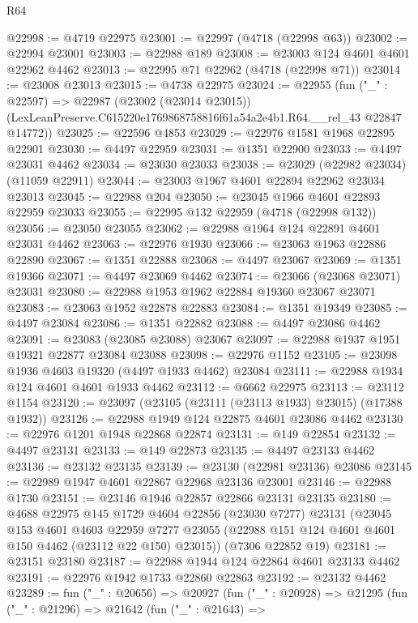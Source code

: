 \begin{lexlean}{R64}
\begin{coremodule}
@22998 := @4719 @22975
@23001 := @22997 (@4718 (@22998 @63))
@23002 := @22994 @23001
@23003 := @22988 @189
@23008 := @23003 @124 @4601 @4601 @22962 @4462
@23013 := @22995 @71 @22962 (@4718 (@22998 @71))
@23014 := @23008 @23013
@23015 := @4738 @22975
@23024 := @22955
    (fun ("_" : @22597) =>
    @22987
      (@23002 (@23014 @23015))
      (LexLeanPreserve.C615220e1769868758816f61a54a2e4b1.R64.__rel_43 @22847 @14772))
@23025 := @22596 @4853
@23029 := @22976 @1581 @1968 @22895 @22901
@23030 := @4497 @22959
@23031 := @1351 @22900
@23033 := @4497 @23031 @4462
@23034 := @23030 @23033
@23038 := @23029 (@22982 @23034) (@11059 @22911)
@23044 := @23003 @1967 @4601 @22894 @22962 @23034 @23013
@23045 := @22988 @204
@23050 := @23045 @1966 @4601 @22893 @22959 @23033
@23055 := @22995 @132 @22959 (@4718 (@22998 @132))
@23056 := @23050 @23055
@23062 := @22988 @1964 @124 @22891 @4601 @23031 @4462
@23063 := @22976 @1930
@23066 := @23063 @1963 @22886 @22890
@23067 := @1351 @22888
@23068 := @4497 @23067
@23069 := @1351 @19366
@23071 := @4497 @23069 @4462
@23074 := @23066 (@23068 @23071) @23031
@23080 := @22988 @1953 @1962 @22884 @19360 @23067 @23071
@23083 := @23063 @1952 @22878 @22883
@23084 := @1351 @19349
@23085 := @4497 @23084
@23086 := @1351 @22882
@23088 := @4497 @23086 @4462
@23091 := @23083 (@23085 @23088) @23067
@23097 := @22988 @1937 @1951 @19321 @22877 @23084 @23088
@23098 := @22976 @1152
@23105 := @23098 @1936 @4603 @19320 (@4497 @1933 @4462) @23084
@23111 := @22988 @1934 @124 @4601 @4601 @1933 @4462
@23112 := @6662 @22975
@23113 := @23112 @1154
@23120 := @23097 (@23105 (@23111 (@23113 @1933) @23015) (@17388 @1932))
@23126 := @22988 @1949 @124 @22875 @4601 @23086 @4462
@23130 := @22976 @1201 @1948 @22868 @22874
@23131 := @149 @22854
@23132 := @4497 @23131
@23133 := @149 @22873
@23135 := @4497 @23133 @4462
@23136 := @23132 @23135
@23139 := @23130 (@22981 @23136) @23086
@23145 := @22989 @1947 @4601 @22867 @22968 @23136 @23001
@23146 := @22988 @1730
@23151 := @23146 @1946 @22857 @22866 @23131 @23135
@23180 := @4688
    @22975
    @145
    @1729
    @4604
    @22856
    (@23030 @7277)
    @23131
    (@23045
      @153
      @4601
      @4603
      @22959
      @7277
      @23055
      (@22988 @151 @124 @4601 @4601 @150 @4462 (@23112 @22 @150) @23015))
    (@7306 @22852 @19)
@23181 := @23151 @23180
@23187 := @22988 @1944 @124 @22864 @4601 @23133 @4462
@23191 := @22976 @1942 @1733 @22860 @22863
@23192 := @23132 @4462
@23289 := fun ("_" : @20656) =>
  @20927
    (fun ("_" : @20928) =>
    @21295
      (fun ("_" : @21296) =>
      @21642
        (fun ("_" : @21643) =>

\end{coremodule}
\end{lexlean}
